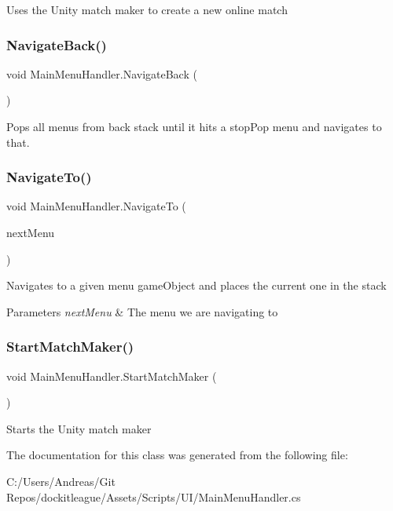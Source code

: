 Uses the Unity match maker to create a new online match 

\hypertarget{class_main_menu_handler_ad04a18db3433e914aae5646267bf07ed}{}\label{class_main_menu_handler_ad04a18db3433e914aae5646267bf07ed} 
\subsubsection{\texorpdfstring{Navigate\+Back()}{NavigateBack()}}
{\footnotesize\ttfamily void Main\+Menu\+Handler.\+Navigate\+Back (\begin{DoxyParamCaption}{ }\end{DoxyParamCaption})}



Pops all menus from back stack until it hits a stop\+Pop menu and navigates to that. 

\hypertarget{class_main_menu_handler_acfea2da02c568977d41b7401d6ce8a9b}{}\label{class_main_menu_handler_acfea2da02c568977d41b7401d6ce8a9b} 
\subsubsection{\texorpdfstring{Navigate\+To()}{NavigateTo()}}
{\footnotesize\ttfamily void Main\+Menu\+Handler.\+Navigate\+To (\begin{DoxyParamCaption}\item[{Game\+Object}]{next\+Menu }\end{DoxyParamCaption})}



Navigates to a given menu game\+Object and places the current one in the stack 


\begin{DoxyParams}{Parameters}
{\em next\+Menu} & The menu we are navigating to\\
\hline
\end{DoxyParams}
\hypertarget{class_main_menu_handler_a7729dec8dd126e78db4d7fd857aeb14b}{}\label{class_main_menu_handler_a7729dec8dd126e78db4d7fd857aeb14b} 
\subsubsection{\texorpdfstring{Start\+Match\+Maker()}{StartMatchMaker()}}
{\footnotesize\ttfamily void Main\+Menu\+Handler.\+Start\+Match\+Maker (\begin{DoxyParamCaption}{ }\end{DoxyParamCaption})}



Starts the Unity match maker 



The documentation for this class was generated from the following file\+:\begin{DoxyCompactItemize}
\item 
C\+:/\+Users/\+Andreas/\+Git Repos/dockitleague/\+Assets/\+Scripts/\+U\+I/Main\+Menu\+Handler.\+cs\end{DoxyCompactItemize}
